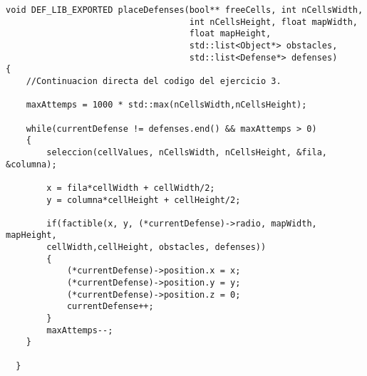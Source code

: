 \begin{lstlisting}
void DEF_LIB_EXPORTED placeDefenses(bool** freeCells, int nCellsWidth,
                                    int nCellsHeight, float mapWidth,
                                    float mapHeight,
                                    std::list<Object*> obstacles,
                                    std::list<Defense*> defenses)
{
    //Continuacion directa del codigo del ejercicio 3.

    maxAttemps = 1000 * std::max(nCellsWidth,nCellsHeight);

    while(currentDefense != defenses.end() && maxAttemps > 0)
    {
        seleccion(cellValues, nCellsWidth, nCellsHeight, &fila, &columna);

        x = fila*cellWidth + cellWidth/2;
        y = columna*cellHeight + cellHeight/2;

        if(factible(x, y, (*currentDefense)->radio, mapWidth, mapHeight,
        cellWidth,cellHeight, obstacles, defenses))
        {
            (*currentDefense)->position.x = x;
            (*currentDefense)->position.y = y;
            (*currentDefense)->position.z = 0;
            currentDefense++;
        }
        maxAttemps--;
    }

  }
\end{lstlisting}
